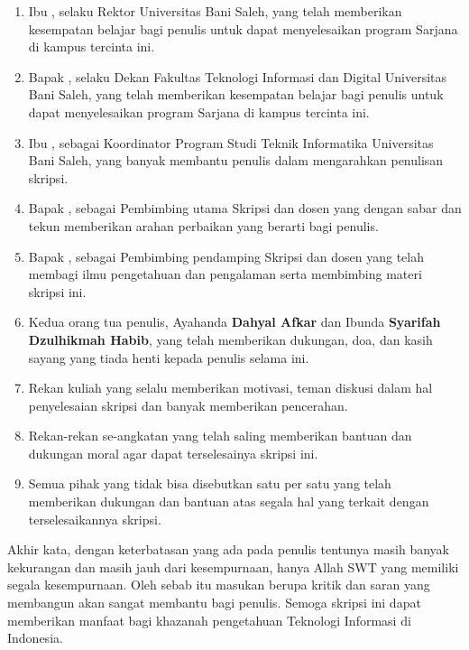 \begin{enumerate}[leftmargin=0.5cm]
    \item Ibu \textbf{\rektor}, selaku Rektor Universitas Bani Saleh, yang telah memberikan kesempatan belajar bagi penulis untuk dapat menyelesaikan program Sarjana di kampus tercinta ini.
    \item Bapak \textbf{\dekan}, selaku Dekan Fakultas Teknologi Informasi dan Digital Universitas Bani Saleh, yang telah memberikan kesempatan belajar bagi penulis untuk dapat menyelesaikan program Sarjana di kampus tercinta ini.
    \item Ibu \textbf{\kaprodi}, sebagai Koordinator Program Studi Teknik Informatika Universitas Bani Saleh, yang banyak membantu penulis dalam mengarahkan penulisan skripsi.
    \item Bapak \textbf{\pembimbingutama}, sebagai Pembimbing utama Skripsi dan dosen yang dengan sabar dan tekun memberikan arahan perbaikan yang berarti bagi penulis.
    \item Bapak \textbf{\pembimbingpendamping}, sebagai Pembimbing pendamping Skripsi dan dosen yang telah membagi ilmu pengetahuan dan pengalaman serta membimbing materi skripsi ini.
    \item Kedua orang tua penulis, Ayahanda \textbf{Dahyal Afkar} dan Ibunda \textbf{Syarifah Dzulhikmah Habib}, yang telah memberikan dukungan, doa, dan kasih sayang yang tiada henti kepada penulis selama ini.
    \item Rekan kuliah yang selalu memberikan motivasi, teman diskusi dalam hal penyelesaian skripsi dan banyak memberikan pencerahan.
    \newpage
    \item Rekan-rekan se-angkatan yang telah saling memberikan bantuan dan dukungan moral agar dapat terselesainya skripsi ini.
    \item Semua pihak yang tidak bisa disebutkan satu per satu yang telah memberikan dukungan dan bantuan atas segala hal yang terkait dengan terselesaikannya skripsi.
\end{enumerate}

Akhir kata, dengan keterbatasan yang ada pada penulis tentunya masih banyak kekurangan dan masih jauh dari kesempurnaan, hanya Allah SWT yang memiliki segala kesempurnaan. Oleh sebab itu masukan berupa kritik dan saran yang membangun akan sangat membantu bagi penulis. Semoga skripsi ini dapat memberikan manfaat bagi khazanah pengetahuan Teknologi Informasi di Indonesia.


